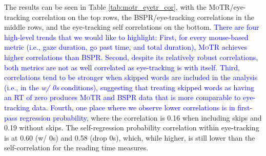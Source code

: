 \documentclass[12pt]{article}
\newcommand{\motr}{\textsc{MoTR}\xspace}
\newcommand{\word}[1]{\textit{#1}}
\newcommand{\change}[1]{\textcolor{blue}{#1}}
\begin{document}
{The results can be seen in Table \ref{tab:motr_eyetr_cor}, with the \motr/eye-tracking correlation on the top rows, the BSPR/eye-tracking correlations in the middle rows, and the eye-tracking self correlations on the bottom. 
\change{There are four high-level trends that we would like to highlight: First, for every mouse-based metric (i.e., gaze duration, go past time, and total duration), \motr achieves higher correlations than BSPR. Second, despite its relatively robust correlations, both metrics are not as well correlated as eye-tracking is with itself. Third, correlations tend to be stronger when skipped words are included in the analysis (i.e., in the \word{w/ 0s} conditions), suggesting that treating skipped words as having an RT of zero produces \motr and BSPR data that is more comparable to eye-tracking data. Fourth, one place where we observe lower correlations is in first-pass regression probability}, where the correlation is 0.16 when including skips and 0.19 without skips. The self-regression probability correlation within eye-tracking is at 0.60 (w/ 0s) and 0.58 (drop 0s), which, while higher, is still lower than the self-correlation for the reading time measures.




}
\end{document}

